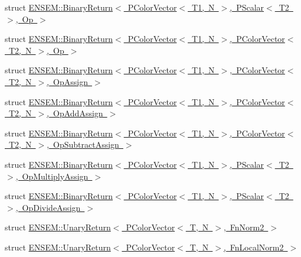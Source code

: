 \begin{DoxyCompactItemize}
\item 
struct \mbox{\hyperlink{structENSEM_1_1BinaryReturn_3_01PColorVector_3_01T1_00_01N_01_4_00_01PScalar_3_01T2_01_4_00_01Op_01_4}{E\+N\+S\+E\+M\+::\+Binary\+Return$<$ P\+Color\+Vector$<$ T1, N $>$, P\+Scalar$<$ T2 $>$, Op $>$}}
\item 
struct \mbox{\hyperlink{structENSEM_1_1BinaryReturn_3_01PColorVector_3_01T1_00_01N_01_4_00_01PColorVector_3_01T2_00_01N_01_4_00_01Op_01_4}{E\+N\+S\+E\+M\+::\+Binary\+Return$<$ P\+Color\+Vector$<$ T1, N $>$, P\+Color\+Vector$<$ T2, N $>$, Op $>$}}
\item 
struct \mbox{\hyperlink{structENSEM_1_1BinaryReturn_3_01PColorVector_3_01T1_00_01N_01_4_00_01PColorVector_3_01T2_00_01N_01_4_00_01OpAssign_01_4}{E\+N\+S\+E\+M\+::\+Binary\+Return$<$ P\+Color\+Vector$<$ T1, N $>$, P\+Color\+Vector$<$ T2, N $>$, Op\+Assign $>$}}
\item 
struct \mbox{\hyperlink{structENSEM_1_1BinaryReturn_3_01PColorVector_3_01T1_00_01N_01_4_00_01PColorVector_3_01T2_00_01N_01_4_00_01OpAddAssign_01_4}{E\+N\+S\+E\+M\+::\+Binary\+Return$<$ P\+Color\+Vector$<$ T1, N $>$, P\+Color\+Vector$<$ T2, N $>$, Op\+Add\+Assign $>$}}
\item 
struct \mbox{\hyperlink{structENSEM_1_1BinaryReturn_3_01PColorVector_3_01T1_00_01N_01_4_00_01PColorVector_3_01T2_00_01N_01_4_00_01OpSubtractAssign_01_4}{E\+N\+S\+E\+M\+::\+Binary\+Return$<$ P\+Color\+Vector$<$ T1, N $>$, P\+Color\+Vector$<$ T2, N $>$, Op\+Subtract\+Assign $>$}}
\item 
struct \mbox{\hyperlink{structENSEM_1_1BinaryReturn_3_01PColorVector_3_01T1_00_01N_01_4_00_01PScalar_3_01T2_01_4_00_01OpMultiplyAssign_01_4}{E\+N\+S\+E\+M\+::\+Binary\+Return$<$ P\+Color\+Vector$<$ T1, N $>$, P\+Scalar$<$ T2 $>$, Op\+Multiply\+Assign $>$}}
\item 
struct \mbox{\hyperlink{structENSEM_1_1BinaryReturn_3_01PColorVector_3_01T1_00_01N_01_4_00_01PScalar_3_01T2_01_4_00_01OpDivideAssign_01_4}{E\+N\+S\+E\+M\+::\+Binary\+Return$<$ P\+Color\+Vector$<$ T1, N $>$, P\+Scalar$<$ T2 $>$, Op\+Divide\+Assign $>$}}
\item 
struct \mbox{\hyperlink{structENSEM_1_1UnaryReturn_3_01PColorVector_3_01T_00_01N_01_4_00_01FnNorm2_01_4}{E\+N\+S\+E\+M\+::\+Unary\+Return$<$ P\+Color\+Vector$<$ T, N $>$, Fn\+Norm2 $>$}}
\item 
struct \mbox{\hyperlink{structENSEM_1_1UnaryReturn_3_01PColorVector_3_01T_00_01N_01_4_00_01FnLocalNorm2_01_4}{E\+N\+S\+E\+M\+::\+Unary\+Return$<$ P\+Color\+Vector$<$ T, N $>$, Fn\+Local\+Norm2 $>$}}

\end{DoxyCompactItemize}
